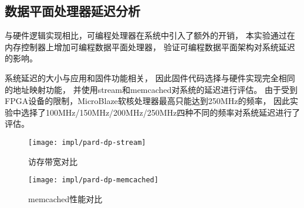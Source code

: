 %


\subsection{数据平面处理器延迟分析}
\label{chap:impl:dp-latency}


与硬件逻辑实现相比，可编程处理器在系统中引入了额外的开销，
本实验通过在内存控制器上增加可编程数据平面处理器，
验证可编程数据平面架构对系统延迟的影响。

系统延迟的大小与应用和固件功能相关，
因此固件代码选择与硬件实现完全相同的地址映射功能，
并使用stream和memcached对系统的延迟进行评估。
由于受到FPGA设备的限制，MicroBlaze软核处理器最高只能达到250MHz的频率，
因此实验中选择了100MHz/150MHz/200MHz/250MHz四种不同的频率对系统延迟进行了评估。

\begin{figure}[b]
\begin{minipage}{0.48\textwidth}
  \centering
  \texttt{[image: impl/pard-dp-stream]}
  \caption{访存带宽对比}
  \label{fig:pard-dp-stream}
\end{minipage}\hfill
\begin{minipage}{0.48\textwidth}
  \centering
  \texttt{[image: impl/pard-dp-memcached]}
  \caption{memcached性能对比}
  \label{fig:pard-dp-memcached}
\end{minipage}
\end{figure}


